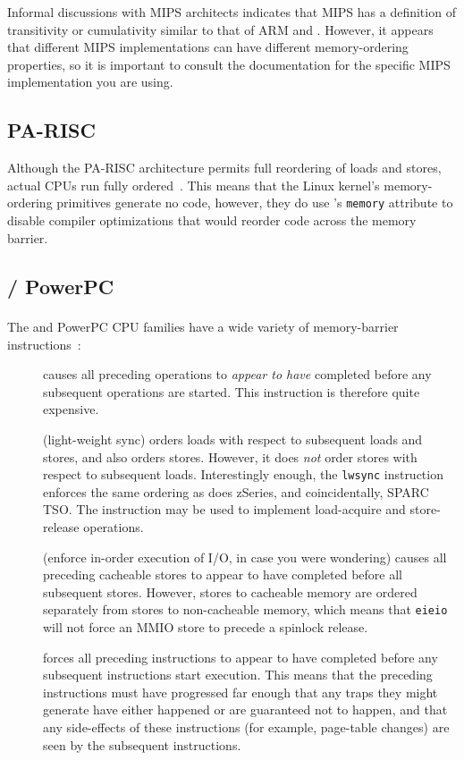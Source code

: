 Informal discussions with MIPS architects indicates that MIPS has a
definition of transitivity or cumulativity similar to that of
ARM and \Power{}.
However, it appears that different MIPS implementations can have
different memory-ordering properties, so it is important to consult
the documentation for the specific MIPS implementation you are using.
\fi

\subsection{PA-RISC}

Although the PA-RISC architecture permits full reordering of loads and
stores, actual CPUs run fully ordered~\cite{GerryKane96a}.
This means that the Linux kernel's memory-ordering primitives generate
no code, however, they do use \GCC's {\tt memory} attribute to disable
compiler optimizations that would reorder code across the memory
barrier.

\subsection{\Power{} / PowerPC}
\label{sec:memorder:POWER / PowerPC}

The \Power{} and PowerPC\textsuperscript{\textregistered}
CPU families have a wide variety of memory-barrier
instructions~\cite{PowerPC94,MichaelLyons05a}:
\begin{description}
\item	[] causes all preceding operations to {\em appear to have}
	completed before any subsequent operations are started.
	This instruction is therefore quite expensive.
\item	[] (light-weight sync) orders loads with respect to
	subsequent loads and stores, and also orders stores.
	However, it does {\em not} order stores with respect to subsequent
	loads.
	Interestingly enough, the {\tt lwsync} instruction enforces
	the same ordering as does zSeries, and coincidentally,
	SPARC TSO.
	The  instruction may be used to implement
	load-acquire and store-release operations.
\item	[] (enforce in-order execution of I/O, in case you
	were wondering) causes all preceding cacheable stores to appear
	to have completed before all subsequent stores.
	However, stores to cacheable memory are ordered separately from
	stores to non-cacheable memory, which means that {\tt eieio}
	will not force an MMIO store to precede a spinlock release.
\item	[] forces all preceding instructions to appear to have
	completed before any subsequent instructions start execution.
	This means that the preceding instructions must have progressed
	far enough that any traps they might generate have either happened
	or are guaranteed not to happen, and that any side-effects of
	these instructions (for example, page-table changes) are seen by the
	subsequent instructions.
\end{description}

